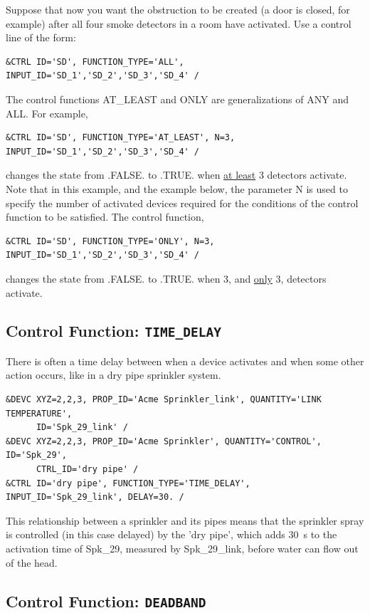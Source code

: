 \documentclass[11pt]{book}
\begin{document}
Suppose that now you want the obstruction to be created (a door is closed, for example) after all four smoke detectors in a room have activated. Use a control line of the form:
\begin{lstlisting}
&CTRL ID='SD', FUNCTION_TYPE='ALL', INPUT_ID='SD_1','SD_2','SD_3','SD_4' /
\end{lstlisting}
The control functions {\ct AT\_LEAST} and {\ct ONLY} are generalizations of {\ct ANY} and {\ct ALL}. For example,
\begin{lstlisting}
&CTRL ID='SD', FUNCTION_TYPE='AT_LEAST', N=3, INPUT_ID='SD_1','SD_2','SD_3','SD_4' /
\end{lstlisting}
changes the state from {\ct .FALSE.} to {\ct .TRUE.} when \underline{at least} 3 detectors activate. Note that in this example, and the example below, the parameter {\ct N} is used to specify the number of activated devices required for the conditions of the control function to be satisfied. The control function,
\begin{lstlisting}
&CTRL ID='SD', FUNCTION_TYPE='ONLY', N=3, INPUT_ID='SD_1','SD_2','SD_3','SD_4' /
\end{lstlisting}
changes the state from {\ct .FALSE.} to {\ct .TRUE.} when 3, and \underline{only} 3, detectors activate.


\subsection{Control Function: \texorpdfstring{{\tt TIME\_DELAY}}{TIME\_DELAY}}

\label{info:TIME_DELAY}

There is often a time delay between when a device activates and when some other action occurs, like in a dry pipe sprinkler system.
\begin{lstlisting}
&DEVC XYZ=2,2,3, PROP_ID='Acme Sprinkler_link', QUANTITY='LINK TEMPERATURE',
      ID='Spk_29_link' /
&DEVC XYZ=2,2,3, PROP_ID='Acme Sprinkler', QUANTITY='CONTROL', ID='Spk_29',
      CTRL_ID='dry pipe' /
&CTRL ID='dry pipe', FUNCTION_TYPE='TIME_DELAY', INPUT_ID='Spk_29_link', DELAY=30. /
\end{lstlisting}
This relationship between a sprinkler and its pipes means that the sprinkler spray is controlled (in this case delayed) by the {\ct 'dry pipe'}, which adds 30~s to the activation time of {\ct Spk\_29}, measured by  {\ct Spk\_29\_link}, before water can flow out of the head.


\subsection{Control Function: \texorpdfstring{{\tt DEADBAND}}{DEADBAND}}
\label{info:DEADBAND}
\end{document}
